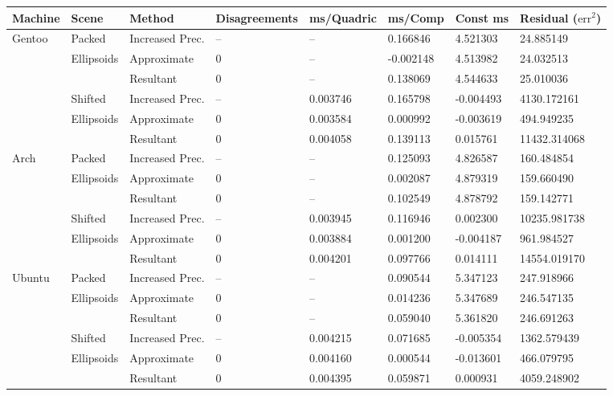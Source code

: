 \begin{tabular}{|l|l|ll|lll|l|}
\hline
Machine & Scene & Method & Disagreements & ms/Quadric & ms/Comp & Const ms & Residual ($\text{err}^2$)\\
\hline
\hline
Gentoo & Packed & Increased Prec. & -- & -- & 0.166846 & 4.521303 & 24.885149\\
& Ellipsoids & Approximate & 0 & -- & -0.002148 & 4.513982 & 24.032513\\
&& Resultant & 0 & -- & 0.138069 & 4.544633 & 25.010036\\
\hline
& Shifted & Increased Prec. & -- & 0.003746 & 0.165798 & -0.004493 & 4130.172161\\
& Ellipsoids & Approximate & 0 & 0.003584 & 0.000992 & -0.003619 & 494.949235\\
&& Resultant & 0 & 0.004058 & 0.139113 & 0.015761 & 11432.314068\\
\hline
Arch & Packed & Increased Prec. & -- & -- & 0.125093 & 4.826587 & 160.484854\\
& Ellipsoids & Approximate & 0 & -- & 0.002087 & 4.879319 & 159.660490\\
&& Resultant & 0 & -- & 0.102549 & 4.878792 & 159.142771\\
\hline
& Shifted & Increased Prec. & -- & 0.003945 & 0.116946 & 0.002300 & 10235.981738\\
& Ellipsoids & Approximate & 0 & 0.003884 & 0.001200 & -0.004187 & 961.984527\\
&& Resultant & 0 & 0.004201 & 0.097766 & 0.014111 & 14554.019170\\
\hline
Ubuntu & Packed & Increased Prec. & -- & -- & 0.090544 & 5.347123 & 247.918966\\
& Ellipsoids & Approximate & 0 & -- & 0.014236 & 5.347689 & 246.547135\\
&& Resultant & 0 & -- & 0.059040 & 5.361820 & 246.691263\\
\hline
& Shifted & Increased Prec. & -- & 0.004215 & 0.071685 & -0.005354 & 1362.579439\\
& Ellipsoids & Approximate & 0 & 0.004160 & 0.000544 & -0.013601 & 466.079795\\
&& Resultant & 0 & 0.004395 & 0.059871 & 0.000931 & 4059.248902\\
\hline
\end{tabular}
